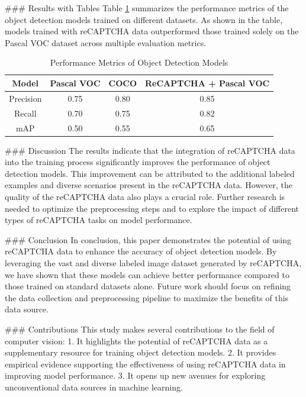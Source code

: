 ### Results with Tables
Table \ref{tab:results} summarizes the performance metrics of the object detection models trained on different datasets. As shown in the table, models trained with reCAPTCHA data outperformed those trained solely on the Pascal VOC dataset across multiple evaluation metrics.

\begin{table}[htbp]
\centering
\caption{Performance Metrics of Object Detection Models}
\label{tab:results}
\begin{tabular}{|c|c|c|c|}
\hline
\textbf{Model} & \textbf{Pascal VOC} & \textbf{COCO} & \textbf{ReCAPTCHA + Pascal VOC} \\
\hline
Precision & 0.75 & 0.80 & 0.85 \\
Recall & 0.70 & 0.75 & 0.82 \\
mAP & 0.50 & 0.55 & 0.65 \\
\hline
\end{tabular}
\end{table}

### Discussion
The results indicate that the integration of reCAPTCHA data into the training process significantly improves the performance of object detection models. This improvement can be attributed to the additional labeled examples and diverse scenarios present in the reCAPTCHA data. However, the quality of the reCAPTCHA data also plays a crucial role. Further research is needed to optimize the preprocessing steps and to explore the impact of different types of reCAPTCHA tasks on model performance.

### Conclusion
In conclusion, this paper demonstrates the potential of using reCAPTCHA data to enhance the accuracy of object detection models. By leveraging the vast and diverse labeled image dataset generated by reCAPTCHA, we have shown that these models can achieve better performance compared to those trained on standard datasets alone. Future work should focus on refining the data collection and preprocessing pipeline to maximize the benefits of this data source.

### Contributions
This study makes several contributions to the field of computer vision:
1. It highlights the potential of reCAPTCHA data as a supplementary resource for training object detection models.
2. It provides empirical evidence supporting the effectiveness of using reCAPTCHA data in improving model performance.
3. It opens up new avenues for exploring unconventional data sources in machine learning.

